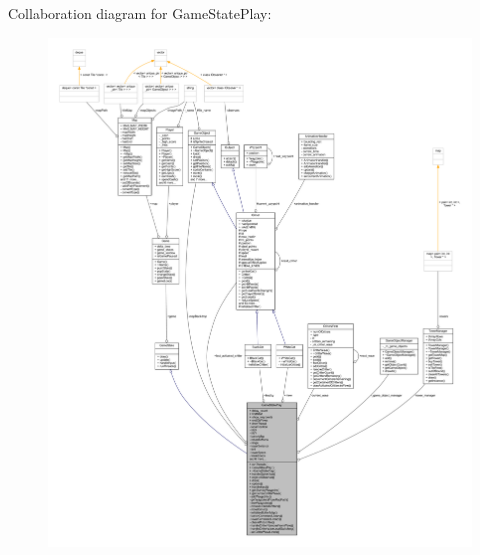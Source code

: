 Collaboration diagram for Game\+State\+Play\+:
\nopagebreak
\begin{figure}[H]
\begin{center}
\leavevmode
\includegraphics[width=350pt]{class_game_state_play__coll__graph}
\end{center}
\end{figure}
